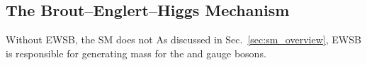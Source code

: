 


\subsection{The Brout--Englert--Higgs Mechanism}
\label{sec:higgs_mech}

Without EWSB, the SM does not As discussed in Sec.~\ref{sec:sm_overview}, EWSB is responsible for generating mass for the \PWpm and \PZ gauge bosons.


